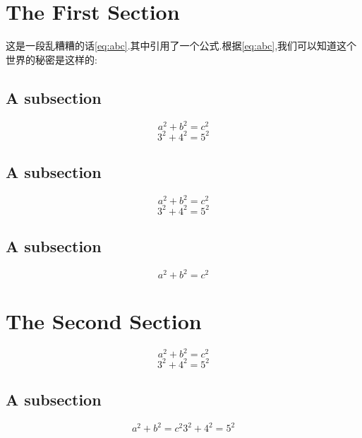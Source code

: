 \documentclass[12pt]{ctexart}
\begin{document}
    \section{The First Section}
    这是一段乱糟糟的话\ref{eq:abc}.其中引用了一个公式.根据\eqref{eq:abc},我们可以知道这个世界的秘密是这样的:\lipsum[8]
    \subsection{A subsection}
        \begin{equation}
            a^2+b^2=c^2
        \end{equation}
        \lipsum[1]
        \begin{equation}
            3^2+4^2=5^2
        \end{equation}
        \subsection{A subsection}
        \begin{equation}
            a^2+b^2=c^2
        \end{equation}
        \begin{equation}
            3^2+4^2=5^2
        \end{equation}
        \subsection{A subsection}
        \begin{equation}
            a^2+b^2=c^2
        \end{equation}
    \section{The Second Section}
    \begin{equation}
        a^2+b^2=c^2
    \end{equation}
    \begin{equation}
        3^2+4^2=5^2
    \end{equation}
    \lipsum[2]
    \subsection{A subsection}
    \begin{subequations}
          \begin{equation}
              a^2+b^2=c^2
          \end{equation}
          \begin{equation}
              3^2+4^2=5^2
          \end{equation}
    \end{subequations}
\end{document}
